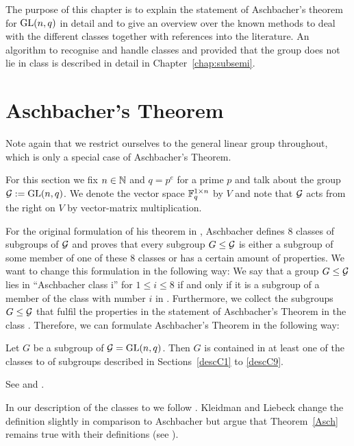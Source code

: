 The purpose of this chapter is to explain the statement of Aschbacher's 
theorem for $\GL(n,q)$ in detail and to give an overview over the known
methods to deal with the different classes together with references into
the literature. An algorithm to recognise and handle classes  and 
provided that the group does not lie in class  is described in detail
in Chapter~\ref{chap:subsemi}.

\section{Aschbacher's Theorem}
\label{sect:aschbacher}

Note again that we restrict ourselves to the general linear group
throughout, which is only a special case of Aschbacher's Theorem.

\begin{Not}
For this section we fix $n \in \mathbb{N}$ and $q=p^e$ for a prime $p$ and
talk about the group $\GG := \GL(n,q)$. We denote the vector space $\mathbb{F}_q^{1
\times n}$ by $V$ and note that $\mathcal{G}$ acts from the right on $V$ by
vector-matrix multiplication.
\end{Not}

For the original formulation of his theorem in \cite{aschbacher}, Aschbacher 
defines $8$ classes
of subgroups of $\mathcal{G}$ and proves that every subgroup $G \le \mathcal{G}$ is either
a subgroup of some member of one of these $8$ classes or has a certain
amount of properties. We want to change this formulation in the following
way: We say that a group $G \le \mathcal{G}$ lies in ``Aschbacher class \CC i''
for $1 \le i \le 8$ if and only if it is a subgroup of a member of
the class with number $i$ in \cite{aschbacher}. Furthermore, we collect
the subgroups $G \le \mathcal{G}$ that fulfil the properties in the statement of 
Aschbacher's Theorem in the class . Therefore, we can formulate
Aschbacher's Theorem in the following way:

\begin{Theo}
\label{Asch}
Let $G$ be a subgroup of\/ $\GG = \GL(n,q)$.
Then $G$ is contained in at least one of the
classes  to  of subgroups described in Sections~\ref{descC1}
to \ref{descC9}.
\end{Theo}
\proofbeg See \cite{aschbacher} and \cite{kleilieb}.
\proofend

\begin{Rem}
In our description of the classes  to  we follow
\cite{kleilieb}. Kleidman and Liebeck change the definition 
slightly in comparison to Aschbacher but argue that Theorem~\ref{Asch}
remains true with their definitions (see \cite[Chapter~4]{kleilieb}).
\end{Rem}

